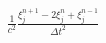 \documentclass[preview]{standalone}
\begin{document}
\begin{align*}
\frac{1}{c^2}\frac{\xi_{j}^{n+1} - 2 \xi_{j}^{n} + \xi_{j}^{n-1}}{\Delta t^2}
\end{align*}
\end{document}
